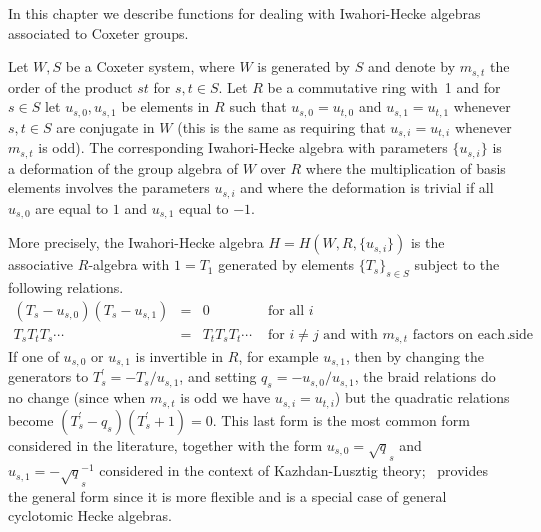 

In  this  chapter  we  describe  functions  for  dealing with Iwahori-Hecke
algebras associated to Coxeter groups.

Let  $W,S$ be a Coxeter system, where $W$ is generated by $S$ and denote by
$m_{s,t}$ the order  of the product  $st$ for $s,t\in  S$. Let $R$ be a
commutative  ring with~1 and for $s\in S$ let $u_{s,0},u_{s,1}$ be elements
in  $R$ such that $u_{s,0}=u_{t,0}$  and $u_{s,1}=u_{t,1}$ whenever $s,t\in
S$ are conjugate in $W$ (this is the same as requiring that
$u_{s,i}=u_{t,i}$   whenever   $m_{s,t}$   is   odd).   The   corresponding
Iwahori-Hecke algebra with parameters $\{u_{s,i}\}$ is a deformation of the
group  algebra of $W$  over $R$ where  the multiplication of basis elements
involves  the parameters $u_{s,i}$ and where  the deformation is trivial if
all $u_{s,0}$ are equal to $1$ and $u_{s,1}$ equal to $-1$.

More  precisely, the  Iwahori-Hecke algebra  $H=H(W,R, \{u_{s,i}\})$ is the
associative  $R$-algebra with $1=T_1$  generated by elements $\{T_s\}_{s\in
S}$    subject   to   the    following   relations.   $$\begin{array}{ccll}
(T_s-u_{s,0})(T_s-u_{s,1})  & = & 0 & \mbox{ for all } i\\ T_sT_tT_s \cdots
& = & T_tT_sT_t \cdots & \mbox{ for $i \ne j$ and with $m_{s,t}$ factors on
each  side}. \end{array} $$ If one  of $u_{s,0}$ or $u_{s,1}$ is invertible
in  $R$,  for  example  $u_{s,1}$,  then  by  changing  the  generators  to
$T^\prime_s=-T_s/u_{s,1}$,  and  setting  $q_s=-u_{s,0}/u_{s,1}$, the braid
relations do no change (since when $m_{s,t}$ is odd we have
$u_{s,i}=u_{t,i}$) but the quadratic relations become
$(T^\prime_s-q_s)(T^\prime_s+1)=0$.  This last form is the most common form
considered  in the literature,  together with the  form $u_{s,0}=\sqrt q_s$
and  $u_{s,1}=-\sqrt q_s^{-1}$ considered in the context of Kazhdan-Lusztig
theory; \CHEVIE\ provides the general form since it is more flexible and is
a special case of general cyclotomic Hecke algebras.

